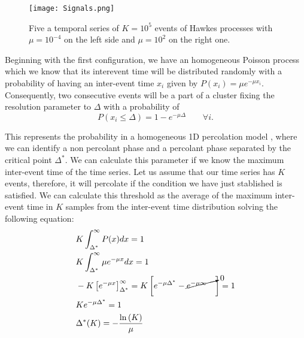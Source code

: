 \begin{figure}[H]
    \centering
    \texttt{[image: Signals.png]}
    \caption{Five a temporal series of $K=10^5$ events of Hawkes processes with $\mu=10^{-4}$ on the left side and $\mu = 10^2$ on the right one.}
    \label{f: Hawkes not stationary}
\end{figure}

Beginning with the first configuration, we have an homogeneous Poisson process which we know that its interevent time will be distributed randomly with a probability of having an inter-event
time $x_i$ given by $P(x_i)=\mu e^{-\mu x_i}$. Consequently, two consecutive events will be a part of a cluster fixing the resolution parameter to $\Delta$ with a probability of
\begin{equation}
    P(x_i\leq \Delta)=1-e^{-\mu\Delta}\quad\quad \forall i.
    \label{eq: Poisson prob of cluster of size 2}
\end{equation}

This represents the probability in a homogeneous 1D percolation model \cite{stauffer2018introduction}, where we can identify a non percolant phase and a percolant phase separated by the
critical point $\Delta^*$. We can calculate this parameter if we know the maximum inter-event time of the time series. Let us assume that our time series has $K$ events, therefore, it will 
percolate if the condition we have just stablished is satisfied. We can calculate this threshold as the average of the maximum inter-event time in $K$ samples from the 
inter-event time distribution solving the following equation:
\begin{equation}
    \begin{split}
        &K\int_{\Delta^*}^{\infty}P(x) dx=1\\
        &K\int_{\Delta^*}^{\infty}\mu e^{-\mu x}dx=1\\
        &-K\left[ e^{-\mu x} \right]_{\Delta^*}^{\infty}=K\left[ e^{-\mu\Delta^*} - \cancelto{0}{e^{-\mu\infty}\quad} \right]=1\\
        &K e^{-\mu\Delta^*}=1\\
        &\Delta^*(K)=-\dfrac{\ln\left(K \right)}{\mu}
    \end{split}
    \label{eq: critical point}
\end{equation}

